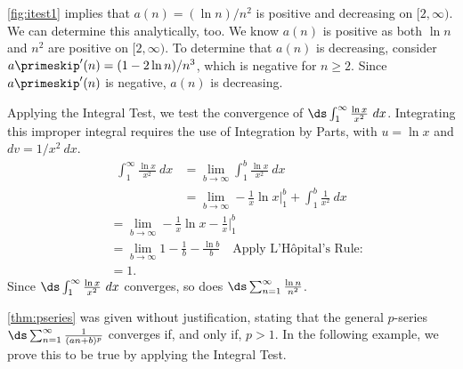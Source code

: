 {\autoref{fig:itest1} implies that $a(n) = (\ln n)/n^2$ is positive and decreasing on $[2,\infty)$. We can determine this analytically, too. We know $a(n)$ is positive as both $\ln n$ and $n^2$ are positive on $[2,\infty)$. To determine that $a(n)$ is decreasing, consider $a\primeskip'(n) = (1-2\ln n)/n^3$, which is negative for $n\geq 2$. Since $a\primeskip'(n)$ is negative, $a(n)$ is decreasing.

Applying the Integral Test, we test the convergence of $\ds \int_1^\infty \frac{\ln x}{x^2}\ dx$. Integrating this improper integral requires the use of Integration by Parts, with $u = \ln x$ and $dv = 1/x^2\ dx$. 
\begin{align*}
\int_1^\infty \frac{\ln x}{x^2}\ dx &= \lim_{b\to\infty} \int_1^b \frac{\ln x}{x^2}\ dx\\
				&= \lim_{b\to\infty} -\frac1x\ln x\Big|_1^b + \int_1^b\frac1{x^2}\ dx %
\end{align*}
\begin{align*}
				&= \lim_{b\to\infty} -\frac1x\ln x -\frac 1x\Big|_1^b\\
				&= \lim_{b\to\infty}1-\frac1b-\frac{\ln b}{b}\quad \text{Apply L'H\^opital's Rule:}\\
				&= 1.
\end{align*}
Since $\ds \int_1^\infty \frac{\ln x}{x^2}\ dx$ converges, so does $\ds \sum_{n=1}^\infty \frac{\ln n}{n^2}$.
%
%
}

\autoref{thm:pseries} was given without justification, stating that the general $p$-series $\ds \sum_{n=1}^\infty \frac 1{(an+b)^p}$ converges if, and only if, $p>1$. In the following example, we prove this to be true by applying the Integral Test.

